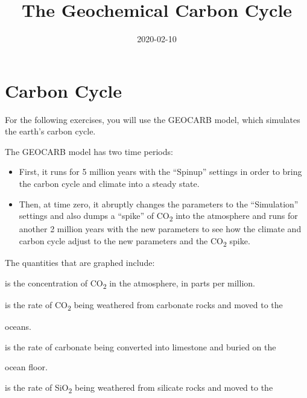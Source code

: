 \documentclass[
]{article}
\title{The Geochemical Carbon Cycle}
\author{}
\date{\vspace{-2.5em}2020-02-10}
\providecommand{\tightlist}{%
  \setlength{\itemsep}{0pt}\setlength{\parskip}{0pt}}
\begin{document}
\maketitle

{
\setcounter{tocdepth}{2}
\tableofcontents
}
\hypertarget{carbon-cycle}{%
\section{Carbon Cycle}\label{carbon-cycle}}

For the following exercises, you will use the GEOCARB model, which
simulates the earth's carbon cycle.

The GEOCARB model has two time periods:

\begin{itemize}
\item
  First, it runs for 5 million years with the ``Spinup'' settings in
  order to bring the carbon cycle and climate into a steady state.
\item
  Then, at time zero, it abruptly changes the parameters to the
  ``Simulation'' settings and also dumps a ``spike'' of
  CO\textsubscript{2} into the atmosphere and runs for another 2 million
  years with the new parameters to see how the climate and carbon cycle
  adjust to the new parameters and the CO\textsubscript{2} spike.
\end{itemize}

The quantities that are graphed include:

\begin{description}
\tightlist
\item[pCO2]
is the concentration of CO\textsubscript{2} in the atmosphere, in parts
per million.
\item[WeatC]
is the rate of CO\textsubscript{2} being weathered from carbonate rocks
and moved to the
\end{description}

oceans.

\begin{description}
\tightlist
\item[BurC]
is the rate of carbonate being converted into limestone and buried on
the
\end{description}

ocean floor.

\begin{description}
\tightlist
\item[WeatS]
is the rate of SiO\textsubscript{2} being weathered from silicate rocks
and moved to the
\end{description}
\end{document}
